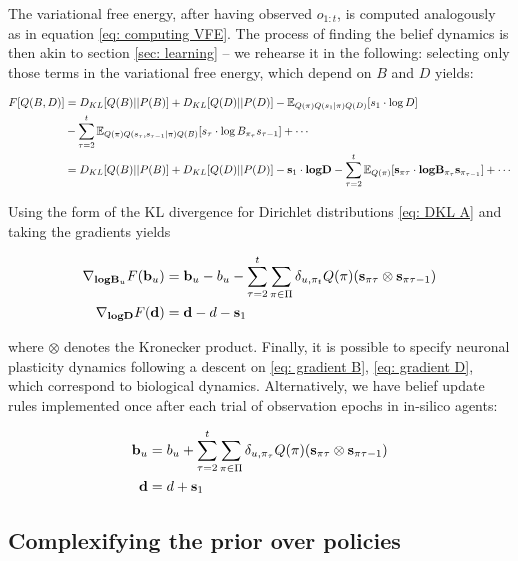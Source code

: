 \documentclass{article}
\newcommand{\E}{\mathbb E}
\begin{document}
The variational free energy, after having observed $o_{1:t}$, is computed analogously as in equation \eqref{eq: computing VFE}. The process of finding the belief dynamics is then akin to section \ref{sec: learning} -- we rehearse it in the following: selecting only those terms in the variational free energy, which depend on $B$ and $D$ yields:

\begin{equation}
    \begin{split}
        F[Q(B,D)] &= D_{KL}[Q(B)||P(B)] + D_{KL}[Q(D)||P(D)] 
         - \E_{Q(\pi)Q(s_1|\pi)Q(D)}[s_1\cdot \log D] \\ &- \sum_{\tau=2}^t \E_{Q(\pi)Q(s_\tau,s_{\tau-1} |\pi) Q(B)} [s_\tau \cdot \log B_{\pi_\tau}s_{\tau-1}] +\cdots\\
        &= D_{KL}[Q(B)||P(B)] + D_{KL}[Q(D)||P(D)] - \bold s_1 \cdot \textbf{log} \bold D-\sum_{\tau=2}^t \E_{Q(\pi)}[\bold s_{\pi\tau} \cdot \textbf{log} \bold B_{\pi_\tau} \bold s_{\pi_{\tau-1}} ]+ \cdots
    \end{split}
\end{equation}
 
Using the form of the KL divergence for Dirichlet distributions \eqref{eq: DKL A} and taking the gradients yields

\begin{align}
       \label{eq: gradient B} \nabla_{\textbf{log} \bold B_u} F(\bold b_u) &=  \bold b_u -b_u -\sum_{\tau =2}^t \sum_{\pi \in \Pi} \delta_{u, \pi_t}  Q(\pi)(\bold s_{\pi\tau} \otimes \bold s_{\pi\tau-1})\\
       \label{eq: gradient D} \nabla_{\textbf{log} \bold D} F(\bold d) &=\bold d -d- \bold s_1
\end{align}

 
where $\otimes$ denotes the Kronecker product. Finally, it is possible to specify neuronal plasticity dynamics following a descent on \eqref{eq: gradient B}, \eqref{eq: gradient D}, which correspond to biological dynamics. Alternatively, we have belief update rules implemented once after each trial of observation epochs in in-silico agents:

\begin{align}
    \bold b_u &= b_u + \sum_{\tau =2}^t \sum_{\pi \in \Pi} \delta_{u, \pi_\tau}  Q(\pi)(\bold s_{\pi\tau} \otimes \bold s_{\pi\tau-1}) \\
    \bold d&= d +\bold s_1
\end{align}


\subsection{Complexifying the prior over policies}
\label{appendix: gamma}
\end{document}
